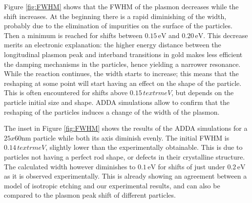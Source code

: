 \documentclass{article}
\begin{document}
Figure \ref{fig:FWHM} shows that the FWHM of the plasmon decreases while the
shift increases. At the beginning there is a rapid diminishing of the width,
probably due to the elimination of impurities on the surface of the particles.
Then a minimum is reached for shifts between $0.15\,\textrm{eV}$ and
$0.20\,\textrm{eV}$. This decrease merits an electronic explanation: the higher
energy distance between the longitudinal plasmon peak and interband transitions
in gold makes less efficient the damping mechanisms in the particles, hence
yielding a narrower resonance. While the reaction continues, the width starts to
increase; this means that the reshaping at some point will start having an
effect on the shape of the particle. This is often encountered for shifts above
$0.15\,textrm{eV}$, but depends on the particle initial size and shape. ADDA
simulations allow to confirm that the reshaping of the particles induces a
change of the width of the plasmon.

The inset in Figure \ref{fig:FWHM} shows the results of the
ADDA\cite{Yurkin2011} simulations for a $25x60$nm particle while both its axis
diminish evenly. The initial FWHM is $0.14\,textrm{eV}$, slightly lower
than the experimentally obtainable. This is due to particles not having a
perfect rod shape, or defects in their crystalline structure. The calculated
width however diminishes to $0.1\,\textrm{eV}$ for shifts of just under
$0.2\,\textrm{eV}$ as it is observed experimentally. This is already showing an
agreement between a model of isotropic etching and our experimental results, and
can also be compared to the plasmon peak shift of different particles.
\end{document}
